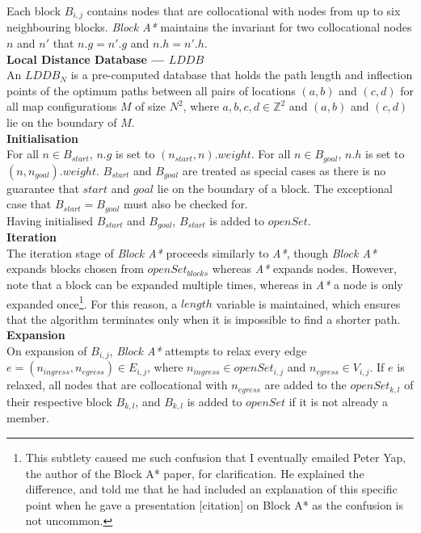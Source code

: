 \documentclass[12pt,notitlepage]{report}
\begin{document}
\noindent
Each block $B_{i,j}$ contains nodes that are collocational with nodes from up to six neighbouring blocks. {\em Block A*} maintains the invariant for two collocational nodes $n$ and $n'$ that $n.g = n'.g$ and $n.h = n'.h$.\\

\noindent
{\bfseries Local Distance Database --- $LDDB$}\\
\noindent
An $LDDB_{N}$ is a pre-computed database that holds the path length and inflection points of the optimum paths between all pairs of locations $(a,b)$ and $(c,d)$ for all map configurations $M$ of size $N^{2}$, where $a,b,c,d \in \mathbb{Z}^{2}$ and $(a,b)$ and $(c,d)$ lie on the boundary of $M$.\\

\noindent
{\bfseries Initialisation}\\
\noindent
For all $n \in B_{start}$, $n.g$ is set to $(n_{start},n).weight$. For all $n \in B_{goal}$, $n.h$ is set to $(n,n_{goal}).weight$. $B_{start}$ and $B_{goal}$ are treated as special cases as there is no guarantee that $start$ and $goal$ lie on the boundary of a block. The exceptional case that $B_{start} = B_{goal}$ must also be checked for.\\

\noindent
Having initialised $B_{start}$ and $B_{goal}$, $B_{start}$ is added to $openSet$.\\

\noindent
{\bfseries Iteration}\\
\noindent
The iteration stage of {\em Block A*} proceeds similarly to {\em A*}, though {\em Block A*} expands blocks chosen from $openSet_{blocks}$ whereas {\em A*} expands nodes. However, note that a block can be expanded multiple times, whereas in {\em A*} a node is only expanded once\footnote{This subtlety caused me such confusion that I eventually emailed Peter Yap, the author of the Block A* paper, for clarification. He explained the difference, and told me that he had included an explanation of this specific point when he gave a presentation [citation] on Block A* as the confusion is not uncommon.}. For this reason, a $length$ variable is maintained, which ensures that the algorithm terminates only when it is impossible to find a shorter path.\\

\noindent
{\bfseries Expansion}\\
\noindent
On expansion of $B_{i,j}$, {\em Block A*} attempts to relax every edge $e=(n_{ingress},n_{egress}) \in E_{i,j}$, where $n_{ingress} \in openSet_{i,j}$ and $n_{egress} \in V_{i,j}$. If $e$ is relaxed, all nodes that are collocational with $n_{egress}$ are added to the $openSet_{k,l}$ of their respective block $B_{k,l}$, and $B_{k,l}$ is added to $openSet$ if it is not already a member. \\
\end{document}

